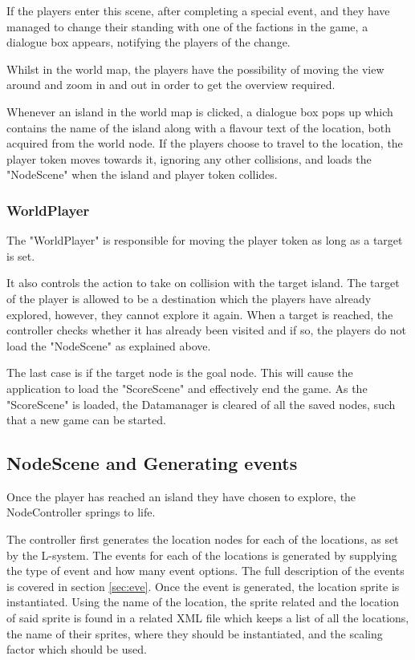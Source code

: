 If the players enter this scene, after completing a special event, and they have managed to change their standing with one of the factions in the game, a dialogue box appears, notifying the players of the change. 

Whilst in the world map, the players have the possibility of moving the view around and zoom in and out in order to get the overview required.

Whenever an island in the world map is clicked, a dialogue box pops up which contains the name of the island along with a flavour text of the location, both acquired from the world node. 
If the players choose to travel to the location, the player token moves towards it, ignoring any other collisions, and loads the "NodeScene" when the island and player token collides. 

\subsubsection{WorldPlayer}
The "WorldPlayer" is responsible for moving the player token as long as a target is set. 

It also controls the action to take on collision with the target island. The target of the player is allowed to be a destination which the players have already explored, however, they cannot explore it again. When a target is reached, the controller checks whether it has already been visited and if so, the players do not load the "NodeScene" as explained above.

The last case is if the target node is the goal node. This will cause the application to load the "ScoreScene" and effectively end the game.
As the "ScoreScene" is loaded, the Datamanager is cleared of all the saved nodes, such that a new game can be started.

\subsection{NodeScene and Generating events}
Once the player has reached an island they have chosen to explore, the NodeController springs to life. 

The controller first generates the location nodes for each of the locations, as set by the L-system.
The events for each of the locations is generated by supplying the type of event and how many event options. The full description of the events is covered in section \ref{sec:eve}.
Once the event is generated, the location sprite is instantiated. Using the name of the location, the sprite related and the location of said sprite is found in a related XML file which keeps a list of all the locations, the name of their sprites, where they should be instantiated, and the scaling factor which should be used.

